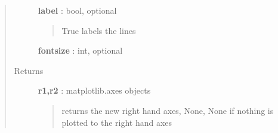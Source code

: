 \documentclass[letterpaper,10pt,english]{sphinxmanual}
\begin{document}
\begin{fulllineitems}
\begin{quote}
\begin{description}
\textbf{label} : bool, optional
\begin{quote}

True labels the lines
\end{quote}

\textbf{fontsize} : int, optional

\item[{Returns}] \leavevmode
\textbf{r1,r2} : matplotlib.axes objects
\begin{quote}

returns the new right hand axes, None, None if nothing is plotted to the right hand axes
\end{quote}

\end{description}\end{quote}

\end{fulllineitems}

\end{document}

